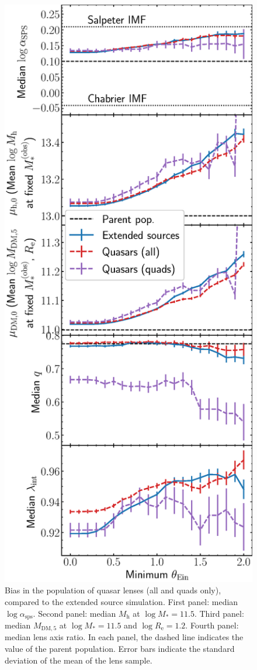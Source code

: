 \documentclass{aa}
\def\reff{R_{\mathrm{e}}}
\def\mstar{M_*}
\def\asps{\alpha_{\mathrm{sps}}}
\def\mdmfive{M_{\mathrm{DM}, 5}}
\def\mhalo{M_{\mathrm{h}}}
\begin{document}
\begin{figure}
\includegraphics[width=\columnwidth]{quasar_bias.eps}
\caption{
Bias in the population of quasar lenses (all and quads only), compared to the extended source simulation.
First panel: median $\log{\asps}$.
Second panel: median $\mhalo$ at $\log{\mstar}=11.5$.
Third panel: median $\mdmfive$ at $\log{\mstar}=11.5$ and $\log{\reff}=1.2$.
Fourth panel: median lens axis ratio.
In each panel, the dashed line indicates the value of the parent population.
Error bars indicate the standard deviation of the mean of the lens sample.
\label{fig:quasarbias}
}
\end{figure}
\end{document}
